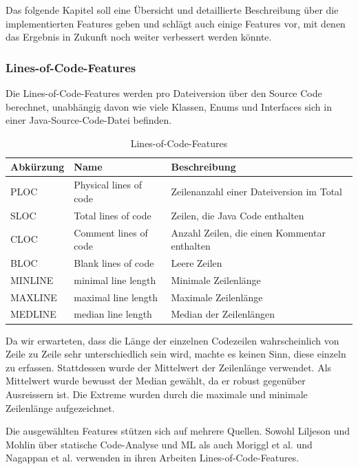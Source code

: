 \documentclass[10pt, a4paper]{article}
\begin{document}
Das folgende Kapitel soll eine Übersicht und detaillierte Beschreibung über die implementierten Features geben und schlägt auch einige Features vor, mit denen das Ergebnis in Zukunft noch weiter verbessert werden könnte.

\subsubsection{Lines-of-Code-Features}
Die Lines-of-Code-Features werden pro Dateiversion über den Source Code berechnet, unabhängig davon wie viele Klassen, Enums und Interfaces sich in einer Java-Source-Code-Datei befinden.
\begin{table}[H]
	\begin{tabular}{l|p{3cm}|p{5.75cm}}
		\textbf{Abkürzung} & \textbf{Name} & \textbf{Beschreibung}\\
		\hline
		PLOC 	& Physical lines of code& Zeilenanzahl einer Dateiversion im Total\\
		SLOC 	& Total lines of code 	& Zeilen, die Java Code enthalten\\
		CLOC 	& Comment lines of code & Anzahl Zeilen, die einen Kommentar enthalten\\
		BLOC 	& Blank lines of code 	& Leere Zeilen\\
		MINLINE & minimal line length 	& Minimale Zeilenlänge\\
		MAXLINE & maximal line length 	& Maximale Zeilenlänge\\
		MEDLINE & median line length 	& Median der Zeilenlängen\\
	\end{tabular}
	\caption{Lines-of-Code-Features}
	\label{tab:linesofcodefeatures}
\end{table}

Da wir erwarteten, dass die Länge der einzelnen Codezeilen wahrscheinlich von Zeile zu Zeile sehr unterschiedlich sein wird, machte es keinen Sinn, diese einzeln zu erfassen. Stattdessen wurde der Mittelwert der Zeilenlänge verwendet. Als Mittelwert wurde bewusst der Median gewählt, da er robust gegenüber Ausreissern ist. Die Extreme wurden durch die maximale und minimale Zeilenlänge aufgezeichnet.

Die ausgewählten Features stützen sich auf mehrere Quellen. Sowohl Liljeson und Mohlin \cite{Liljeson831487} über statische Code-Analyse und \ac{ML} als auch Moriggl et al. \cite{Moriggl831473} und Nagappan et al. \cite{Nagappan:2005:URC:1062455.1062514} verwenden in ihren Arbeiten Lines-of-Code-Features. 
\end{document}
